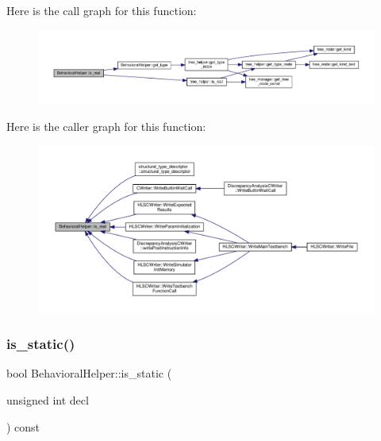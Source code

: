 Here is the call graph for this function\+:
\nopagebreak
\begin{figure}[H]
\begin{center}
\leavevmode
\includegraphics[width=350pt]{dd/db2/classBehavioralHelper_a33f288afc86fcde819e290640fce8843_cgraph}
\end{center}
\end{figure}
Here is the caller graph for this function\+:
\nopagebreak
\begin{figure}[H]
\begin{center}
\leavevmode
\includegraphics[width=350pt]{dd/db2/classBehavioralHelper_a33f288afc86fcde819e290640fce8843_icgraph}
\end{center}
\end{figure}
\mbox{\label{classBehavioralHelper_a8195871ec6398c224dfbda443db4855f}} 
\subsubsection{\texorpdfstring{is\+\_\+static()}{is\_static()}}
{\footnotesize\ttfamily bool Behavioral\+Helper\+::is\+\_\+static (\begin{DoxyParamCaption}\item[{unsigned int}]{decl }\end{DoxyParamCaption}) const\hspace{0.3cm}{\ttfamily [virtual]}}



